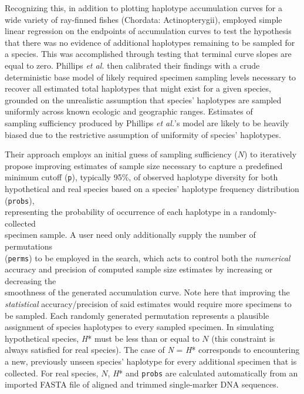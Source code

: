Recognizing this, in addition to plotting haplotype accumulation curves for a wide variety of ray-finned fishes (Chordata: Actinopterygii), \cite{phillips2015exploration} employed simple linear regression on the endpoints of accumulation curves to test the hypothesis that there was no evidence of additional haplotypes remaining to be sampled for a species. This was accomplished through testing that terminal curve slopes are equal to zero. Phillips \textit{et al.} \cite{phillips2015exploration} then calibrated their findings with a crude deterministic base model of likely required specimen sampling levels necessary to recover all estimated total haplotypes that might exist for a given species, grounded on the unrealistic assumption that species' haplotypes are sampled uniformly across known ecologic and geographic ranges. Estimates of \\ sampling sufficiency produced by Phillips \textit{et al.}'s \cite{phillips2015exploration} model are likely to be heavily biased due to the restrictive assumption of uniformity of species' haplotypes.


Their approach employs an initial guess of sampling sufficiency ($N$) to iteratively propose improving estimates of sample size necessary to capture a predefined minimum cutoff ({\tt p}), typically 95\%, of observed haplotype diversity for both hypothetical and real species based on a species' haplotype frequency distribution ({\tt probs}), \\ representing the probability of occurrence of each haplotype in a randomly-collected \\ specimen sample. A user need only additionally supply the number of permutations \\ ({\tt perms}) to be employed in the search, which acts to control both the \textit{numerical} accuracy and precision of computed sample size estimates by increasing or decreasing the \\ smoothness of the generated accumulation curve. Note here that improving the \textit{statistical} accuracy/precision of said estimates would require more specimens to be sampled.  Each randomly generated permutation represents a plausible assignment of species haplotypes to every sampled specimen. In simulating hypothetical species, \textit{H}* must be less than or equal to $N$ (this constraint is always satisfied for real species). The case of \textit{N} = \textit{H}*  corresponds to encountering a new, previously unseen species' haplotype for every additional specimen that is collected. For real species, $N$, \textit{H}* and {\tt probs} are calculated automatically from an imported FASTA file of aligned and trimmed single-marker DNA sequences.

